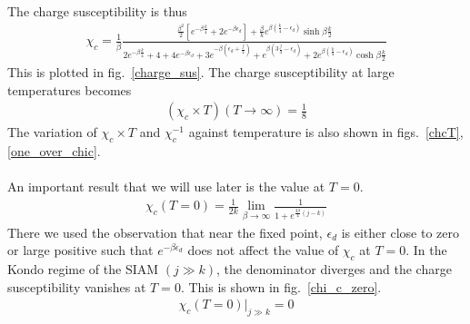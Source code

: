 \documentclass[twoside,11pt]{report}
\numberwithin{equation}{section}
\begin{document}
The charge susceptibility is thus
\begin{equation}\begin{aligned}
	\chi_c = \frac{1}{\beta}\frac{\frac{\beta^2}{2}\left[e^{-\beta \frac{k}{4}} + 2e^{-\beta \epsilon_d}\right] + \frac{\beta}{k}e^{\beta\left(\frac{k}{4} - \epsilon_d\right)}\sinh \beta\frac{k}{2}}{2e^{-\beta \frac{k}{4}} + 4 + 4e^{-\beta \epsilon_d} + 3e^{-\beta\left( \epsilon_d + \frac{j}{4} \right) } + e^{\beta\left( 3\frac{j}{4} - \epsilon_d \right)} + 2e^{\beta \left(\frac{k}{4} - \epsilon_d\right)}\cosh \beta \frac{k}{2}}
\end{aligned}\end{equation}
This is plotted in fig.~\ref{charge_sus}. The charge susceptibility at large temperatures becomes
\begin{equation}\begin{aligned}
	\left(\chi_c\times T\right) (T \to \infty) = \frac{1}{8}
\end{aligned}\end{equation}
The variation of \(\chi_c \times T\) and \(\chi_c^{-1}\) against temperature is also shown in figs.~\ref{chcT},\ref{one_over_chic}.
\\\\An important result that we will use later is the value at \(T=0\).
\begin{equation}\begin{aligned}
	\chi_c(T=0) =  \frac{1}{2k}\lim_{\beta \to \infty} \frac{1}{1 + e^{\frac{3\beta}{4} \left(j-k\right) }}
\end{aligned}\end{equation}
There we used the observation that near the fixed point, \(\epsilon_d\) is either close to zero or large positive such that \(e^{-\beta \epsilon_d}\) does not affect the value of \(\chi_c\) at \(T=0\). In the Kondo regime of the SIAM \((j \gg k)\), the denominator diverges and the charge susceptibility vanishes at \(T=0\). This is shown in fig.~\ref{chi_c_zero}.
\begin{equation}\begin{aligned}
	\chi_c(T=0)\bigg\vert_{j \gg k} = 0
\end{aligned}\end{equation}
\end{document}
